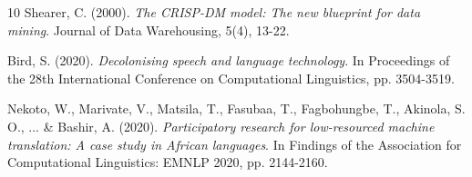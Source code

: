 \documentclass[
]{ceurart}
\begin{document}
\begin{thebibliography}{10}
Shearer, C. (2000).
\textit{The CRISP-DM model: The new blueprint for data mining}.
Journal of Data Warehousing, 5(4), 13-22.

Bird, S. (2020).
\textit{Decolonising speech and language technology}.
In Proceedings of the 28th International Conference on Computational Linguistics, pp. 3504-3519.

Nekoto, W., Marivate, V., Matsila, T., Fasubaa, T., Fagbohungbe, T., Akinola, S. O., ... \& Bashir, A. (2020).
\textit{Participatory research for low-resourced machine translation: A case study in African languages}.
In Findings of the Association for Computational Linguistics: EMNLP 2020, pp. 2144-2160.

\end{thebibliography}
\end{document}
